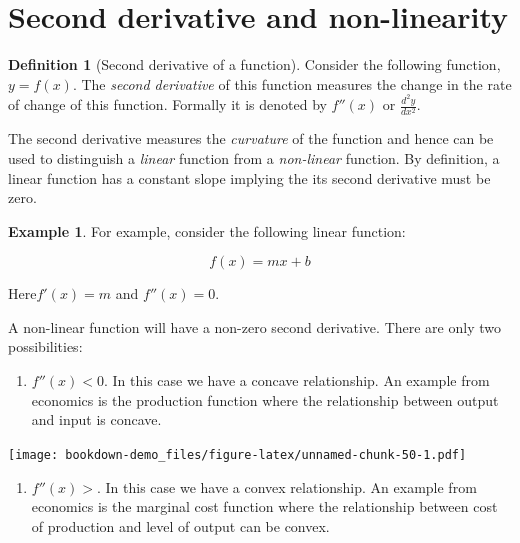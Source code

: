 \documentclass[
]{book}
\providecommand{\tightlist}{%
  \setlength{\itemsep}{0pt}\setlength{\parskip}{0pt}}
\theoremstyle{definition}
\newtheorem{definition}{Definition}[chapter]
\theoremstyle{definition}
\newtheorem{example}{Example}[chapter]
\theoremstyle{definition}
\theoremstyle{definition}
\theoremstyle{remark}
\begin{document}
\hypertarget{second-derivative-and-non-linearity}{%
\section{Second derivative and non-linearity}\label{second-derivative-and-non-linearity}}

\begin{definition}[Second derivative of a function]
\protect\hypertarget{def:unnamed-chunk-48}{}\label{def:unnamed-chunk-48}Consider the following function, \(y=f(x)\). The \emph{second derivative} of this function measures the change in the rate of change of this function. Formally it is denoted by \(f''(x)\) or \(\displaystyle{\frac{d^2y}{dx^2}}\).
\end{definition}

The second derivative measures the \emph{curvature} of the function and hence can be used to distinguish a \emph{linear} function from a \emph{non-linear} function. By definition, a linear function has a constant slope implying the its second derivative must be zero.

\begin{example}
\protect\hypertarget{exm:unnamed-chunk-49}{}\label{exm:unnamed-chunk-49}For example, consider the following linear function:

\[f(x) = mx +b\]

Here\(f'(x)=m\) and \(f''(x)=0\).
\end{example}

A non-linear function will have a non-zero second derivative. There are only two possibilities:

\begin{enumerate}
\def\labelenumi{\arabic{enumi}.}
\tightlist
\item
  \(f''(x)<0\). In this case we have a concave relationship. An example from economics is the production function where the relationship between output and input is concave.
\end{enumerate}

\texttt{[image: bookdown-demo\_files/figure-latex/unnamed-chunk-50-1.pdf]}

\begin{enumerate}
\def\labelenumi{\arabic{enumi}.}
\setcounter{enumi}{1}
\tightlist
\item
  \(f''(x)>\). In this case we have a convex relationship. An example from economics is the marginal cost function where the relationship between cost of production and level of output can be convex.
\end{enumerate}
\end{document}
